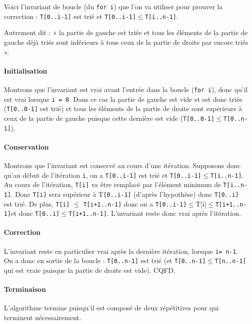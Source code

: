 \ifprof
\begin{corrige}

Voici l’invariant de boucle (du \lstinline{for i}) que l’on va utiliser pour prouver la correction :
\lstinline{T[0..i-1]} est trié et \lstinline{T[0..i-1]}$\leq$\lstinline{T[i..n-1]}.

Autrement dit : « la partie de gauche est triée et tous les éléments de la partie de
gauche déjà triés sont inférieurs à tous ceux de la partie de droite par encore triés ».

\paragraph*{Initialisation}
 Montrons que l’invariant est vrai avant l’entrée dans la boucle (\lstinline{for i}), donc qu’il est vrai lorsque \lstinline{i = 0}. Dans ce cas la partie de gauche est vide et est donc
triée (\lstinline{T[0..0-1]} est trié) et tous les éléments de la partie de droite sont supérieurs à ceux
de la partie de gauche puisque cette dernière est vide (\lstinline{T[0..0-1]}$\leq$\lstinline{T[0..n-1]}).

\paragraph*{Conservation}
 Montrons que l’invariant est conservé au cours d’une itération.
Supposons donc qu’au début de l’itération \lstinline{i}, on a \lstinline{T[0..i-1]} est trié et \lstinline{T[0..i-1]}$\leq$\lstinline{T[i..n-1]}.
Au cours de l’itération, \lstinline{T[i]} va être remplacé par l’élément minimum de \lstinline{T[i..n-1]}. Donc
\lstinline{T[i]} sera supérieur à T\lstinline{[0..i-1]} (d’après l’hypothèse) donc \lstinline{T[0..i]} est trié. De plus, \lstinline{T[i]} $\leq$
\lstinline{T[i+1..n-1]} donc on a \lstinline{T[0..i-1]}$\leq$T[i]$\leq$\lstinline{T[i+1..n-1]}et donc \lstinline{T[0..i]}$\leq$\lstinline{T[i+1..n-1]}.
L’invariant reste donc vrai après l’itération.

\paragraph*{Correction}
L’invariant reste en particulier vrai après la dernière itération, lorsque \lstinline{i= n-1}. On a donc en sortie de la boucle : \lstinline{T[0..n-1]} est trié (et \lstinline{T[0..n-1]}$\leq$\lstinline{T[n..n-1]} qui
est vraie puisque la partie de droite est vide). CQFD.

\paragraph*{Terminaison}
L’algorithme termine puisqu’il est composé de deux répétitives pour qui terminent
nécessairement.
\end{corrige}

